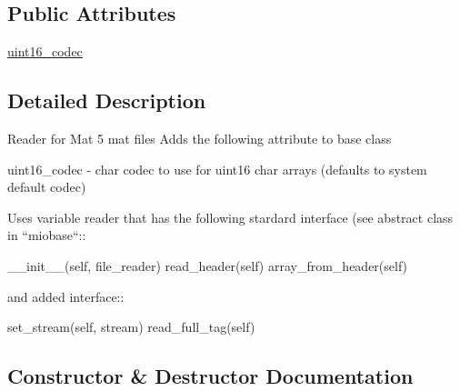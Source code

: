 \subsection*{Public Attributes}
\begin{DoxyCompactItemize}
\item 
\hyperlink{classscipy_1_1io_1_1matlab_1_1mio5_1_1MatFile5Reader_a158d3981a776da56155fdbc4744517de}{uint16\+\_\+codec}
\end{DoxyCompactItemize}


\subsection{Detailed Description}
\begin{DoxyVerb}Reader for Mat 5 mat files
Adds the following attribute to base class

uint16_codec - char codec to use for uint16 char arrays
    (defaults to system default codec)

Uses variable reader that has the following stardard interface (see
abstract class in ``miobase``::

   __init__(self, file_reader)
   read_header(self)
   array_from_header(self)

and added interface::

   set_stream(self, stream)
   read_full_tag(self)\end{DoxyVerb}
 

\subsection{Constructor \& Destructor Documentation}
\hypertarget{classscipy_1_1io_1_1matlab_1_1mio5_1_1MatFile5Reader_a1aeaab025fda79263f766eeb6e02ae6d}{}
